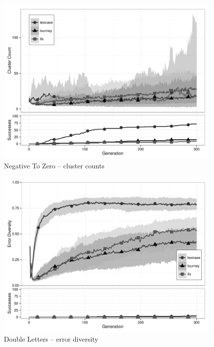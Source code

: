\begin{figure}[p] %
\centering
\includegraphics[width=11.5cm]{negative-to-zero-cluster.pdf}
\caption{Negative To Zero -- cluster counts}
\label{negative-to-zeroClu}
\end{figure}

\begin{figure}[p] %
\centering
\includegraphics[width=11.5cm]{double-letters-diversity.pdf}
\caption{Double Letters -- error diversity}
\label{double-lettersDiv}
\end{figure}

